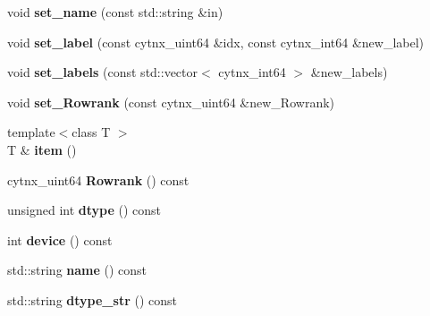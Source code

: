 \begin{DoxyCompactItemize}
\item 
\mbox{\label{classcytnx_1_1UniTensor_ad2ee7e756d5fc9e05faf814b99151544}} 
void {\bfseries set\+\_\+name} (const std\+::string \&in)
\item 
\mbox{\label{classcytnx_1_1UniTensor_a960547851b0811c2417eec7bdd99641d}} 
void {\bfseries set\+\_\+label} (const cytnx\+\_\+uint64 \&idx, const cytnx\+\_\+int64 \&new\+\_\+label)
\item 
\mbox{\label{classcytnx_1_1UniTensor_a6e17d3849392171f61d6bebd5ac2b3f2}} 
void {\bfseries set\+\_\+labels} (const std\+::vector$<$ cytnx\+\_\+int64 $>$ \&new\+\_\+labels)
\item 
\mbox{\label{classcytnx_1_1UniTensor_ae0682945588dd82a4d97a97db49c1b51}} 
void {\bfseries set\+\_\+\+Rowrank} (const cytnx\+\_\+uint64 \&new\+\_\+\+Rowrank)
\item 
\mbox{\label{classcytnx_1_1UniTensor_a8872f2780d7b3dd00608229599a848d2}} 
{\footnotesize template$<$class T $>$ }\\T \& {\bfseries item} ()
\item 
\mbox{\label{classcytnx_1_1UniTensor_aa1463f073b58cb79d46a0974d9f6ef89}} 
cytnx\+\_\+uint64 {\bfseries Rowrank} () const
\item 
\mbox{\label{classcytnx_1_1UniTensor_aa3a370844d981cb86c3d784ecbb573c1}} 
unsigned int {\bfseries dtype} () const
\item 
\mbox{\label{classcytnx_1_1UniTensor_a8e4a44ff5b17788458dc8cf2642f811f}} 
int {\bfseries device} () const
\item 
\mbox{\label{classcytnx_1_1UniTensor_a55941f8078598076309486cc1de3d73f}} 
std\+::string {\bfseries name} () const
\item 
\mbox{\label{classcytnx_1_1UniTensor_a91173048a7985caa45786a7c08f68c40}} 
std\+::string {\bfseries dtype\+\_\+str} () const
\item 

\end{DoxyCompactItemize}
